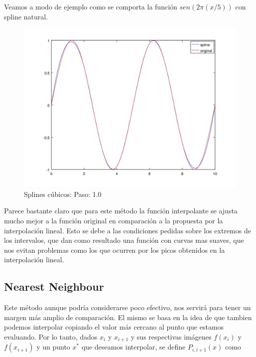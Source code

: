 Veamos a modo de ejemplo como se comporta la función $sen(2\pi(x/5))$ con spline natural.

\pagebreak

\begin{figure}[h]
\centering
  \begin{minipage}[b]{.9\textwidth}
    \includegraphics[width=\textwidth]{complementos/spline_1.jpg}
    \caption{Splines cúbicos: Paso: 1.0}
  \end{minipage}
\end{figure}


Parece bastante claro que para este método la función interpolante se ajusta mucho mejor a la función original en comparación a la propuesta por la interpolación lineal. Esto se debe a las condiciones pedidas sobre los extremos de los intervalos, que dan como resultado una función con curvas mas suaves, que nos evitan problemas como los que ocurren por los picos obtenidos en la interpolación lineal. 

\subsection{Nearest Neighbour}

Este método aunque podría considerarse poco efectivo, nos servirá para tener un margen más amplio de comparación. El mismo se basa en la idea de que tambien podemos interpolar copiando el valor más cercano al punto que estamos evaluando. 
Por lo tanto, dados $x_i$ y $x_{i+1}$ y sus respectivas imágenes $f(x_i)$ y $f(x_{i+1})$ y un punto $x^*$ que deseamos interpolar, se define $P_{i, i+1}(x)$ como
 
